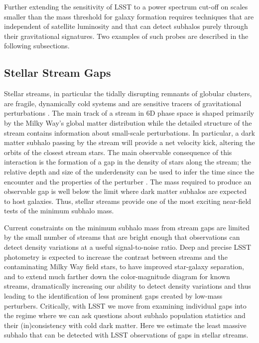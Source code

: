Further extending the sensitivity of LSST to a power spectrum cut-off on scales smaller than the mass threshold for galaxy formation requires techniques that are independent of satellite luminosity and that can detect subhalos purely through their gravitational signatures. Two examples of such probes are described in the following subsections.


\subsection{Stellar Stream Gaps }
\label{sec:stream_gaps}

Stellar streams, in particular the tidally disrupting remnants of globular clusters, are fragile, dynamically cold systems and are sensitive tracers of gravitational perturbations \citep[][]{2002MNRAS.332..915I,2002ApJ...570..656J,2011ApJ...731...58Y,Carlberg:2012}.
The main track of a stream in 6D phase space is shaped primarily by the Milky Way's global matter distribution while the detailed structure of the stream contains information about small-scale perturbations. 
In particular, a dark matter subhalo passing by the stream will provide a net velocity kick, altering the orbits of the closest stream stars.
The main observable consequence of this interaction is the formation of a gap in the density of stars along the stream; the relative depth and size of the underdensity can be used to infer the time since the encounter and the properties of the perturber \citep{Carlberg:2012, Erkal:2015}. The mass required to produce an observable gap \citep[$10^5-10^6 \Msun$,][]{erkal2016,bovy:2017} is well below the limit where dark matter subhalos are expected to host galaxies. Thus, stellar streams provide one of the most exciting near-field tests of the minimum subhalo mass.

Current constraints on the minimum subhalo mass from stream gaps are limited by the small number of streams that are bright enough that observations can detect density variations at a useful signal-to-noise ratio. Deep and precise LSST photometry is expected to increase the contrast between streams and the contaminating Milky Way field stars, to have improved star-galaxy separation, and to extend much farther down the color-magnitude diagram for known streams, dramatically increasing our ability to detect density variations and thus leading to the identification of less prominent gaps created by low-mass perturbers. Critically, with LSST we move from examining individual gaps into the regime where we can ask questions about subhalo population statistics and their (in)consistency with cold dark matter.
Here we estimate the least massive subhalo that can be detected with LSST observations of gaps in stellar streams.

